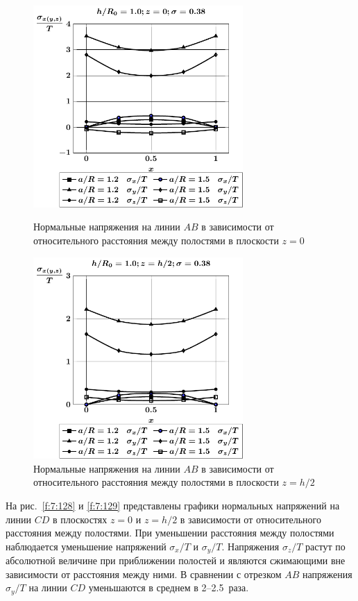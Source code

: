 \begin{figure}[h!]
\centering\footnotesize
\parbox[b]{7.5cm}{\centering\includegraphics[width=8cm]{cav24-a-h10-r10-z0.pdf}
\caption{Нормальные напряжения на линии $AB$ в зависимости от относительного расстояния между полостями в плоскости $z=0$
\label{f:7:126}}}\hfil\hfil
\parbox[b]{7.5cm}{\centering\includegraphics[width=8cm]{cav24-a-h10-r10-z1.pdf}
\caption{Нормальные напряжения на линии $AB$ в зависимости от относительного расстояния между полостями в плоскости $z=h/2$
\label{f:7:127}}}
\end{figure}

На рис.~\ref{f:7:128} и \ref{f:7:129} представлены графики нормальных напряжений на линии $CD$ в плоскостях $z=0$ и $z=h/2$ в зависимости от относительного расстояния между полостями. При уменьшении расстояния между полостями наблюдается уменьшение напряжений $\sigma_x/T$ и $\sigma_y/T$. Напряжения $\sigma_z/T$ растут по абсолютной величине при приближении полостей и являются сжимающими вне зависимости от расстояния между ними. В сравнении с отрезком $AB$ напряжения $\sigma_y/T$ на линии $CD$ уменьшаются в среднем в 2--2.5~раза.


